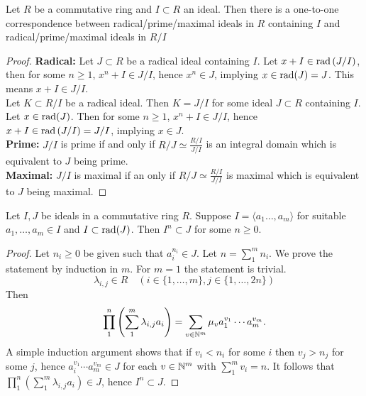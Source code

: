 \begin{proposition}\label{RadicalPrimeMaximalIdealsMatchThoseOfQuotientRings}
    Let $R$ be a commutative ring and $I\subset R$ an ideal. Then there is a one-to-one correspondence between radical/prime/maximal ideals in $R$ containing $I$ and radical/prime/maximal ideals in $R/I$  
\end{proposition}
\begin{proof}
    \textbf{Radical:} Let $J\subset R$ be a radical ideal containing $I$. Let $x+ I\in \mathrm{rad}\left(J/I\right)$, then for some $n\geq 1$, $x^n + I \in J/I$, hence $x^n \in J$, implying $x\in \mathrm{rad}(J) = J$. This means $x+I \in J/I$.\\
    Let $K \subset R/I$ be a radical ideal. Then $K=J/I$ for some ideal $J\subset R$ containing $I$. Let $x\in \mathrm{rad}(J)$. Then for some $n\geq 1$, $x^n+I\in J/I$, hence $x+I \in \mathrm{rad}\left(J/I\right) = J/I$, implying $x\in J$.\\  
    \textbf{Prime:}
        $J/I$ is prime if and only if $R/J\simeq \frac{R/I}{J/I}$ is an integral domain which is equivalent to $J$ being prime.\\    
    \textbf{Maximal:}
        $J/I$ is maximal if an only if $R/J\simeq \frac{R/I}{J/I}$ is maximal which is equivalent to $J$ being maximal.
\end{proof}
\begin{lemma}\label{RadicalLemma}
    Let $I,J$ be ideals in a commutative ring $R$. Suppose $I=\langle a_1\dots,a_m\rangle $ for suitable $a_1,\dots,a_m\in I$ and $I\subset \mathrm{rad}(J)$. Then $I^n \subset J$ for some $n\geq 0$.
\end{lemma}
\begin{proof}
     Let $n_i\geq 0$ be given such that $a_i^{n_i}\in J$. Let $n=\sum_1^m n_i$. We prove the statement by induction in $m$. For $m=1$ the statement is trivial. 
     $$\lambda_{i,j}\in R\quad (i\in\{1,\dots, m\}, j\in\{1,\dots,2n\})$$
     Then 
     $$\prod_1^{n} \left(\sum_1^{m} \lambda_{i,j}a_i\right) = \sum_{v\in \mathbb{N}^m} \mu_v a_1^{v_1}\cdots a_m^{v_m}.$$
     A simple induction argument shows that if $v_i< n_i$ for some $i$ then $v_j>n_j$ for some $j$, hence $a_i^{v_1}\cdots a_m^{v_m}\in J$ for each $v\in \mathbb{N}^m$ with $\sum_1^m v_i = n$. It follows that $\prod_1^{n} \left(\sum_1^{m} \lambda_{i,j}a_i\right)\in J$, hence $I^n\subset J$.
\end{proof}
